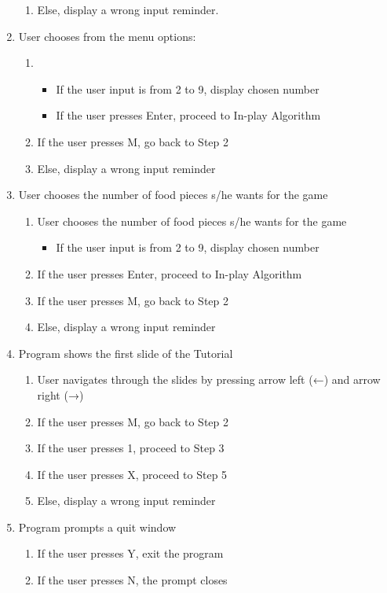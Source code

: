 \begin{enumerate}
\begin{enumerate}[label=\alph*.]
        \item Else, display a wrong input reminder.
    \end{enumerate}
    
    \item User chooses from the menu options:
        \begin{enumerate}[label=\alph*]
            \item
            \begin{itemize}[label={}]
                \item If the user input is from 2 to 9, display chosen number 
                \item \hspace{1cm} If the user presses Enter, proceed to In-play Algorithm
            \end{itemize}
            \item  If the user presses M, go back to Step 2
	        \item Else, display a wrong input reminder
        \end{enumerate}
    \item User chooses the number of food pieces s/he wants for the game
        \begin{enumerate}[label=\alph*]
            \item User chooses the number of food pieces s/he wants for the game
            \begin{itemize}[label={}]
                \item If the user input is from 2 to 9, display chosen number
            \end{itemize}
            \item If the user presses Enter, proceed to In-play Algorithm
            \item If the user presses M, go back to Step 2
            \item Else, display a wrong input reminder
        \end{enumerate}
    \item Program shows the first slide of the Tutorial
        \begin{enumerate}[label=\alph*]
        \item User navigates through the slides by pressing arrow left (←) and arrow right (→)
        \item If the user presses M, go back to Step 2
        \item If the user presses 1, proceed to Step 3
        \item If the user presses X, proceed to Step 5
        \item Else, display a wrong input reminder
        \end{enumerate}
    \item Program prompts a quit window
        \begin{enumerate}[label=\alph*]
            \item If the user presses Y, exit the program
            \item If the user presses N, the prompt closes
        \end{enumerate}
\end{enumerate}


